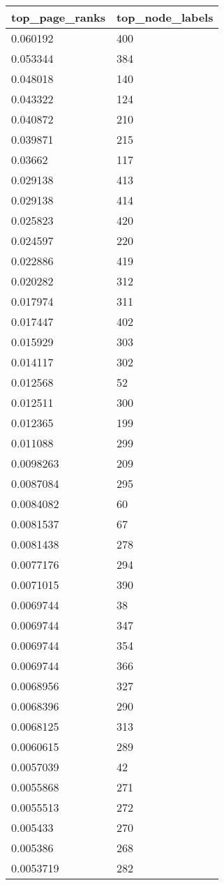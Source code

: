 \begin{tabular}{ll}
top_page_ranks & top_node_labels \\ 
\hline 
0.060192 & 400 \\ 
0.053344 & 384 \\ 
0.048018 & 140 \\ 
0.043322 & 124 \\ 
0.040872 & 210 \\ 
0.039871 & 215 \\ 
0.03662 & 117 \\ 
0.029138 & 413 \\ 
0.029138 & 414 \\ 
0.025823 & 420 \\ 
0.024597 & 220 \\ 
0.022886 & 419 \\ 
0.020282 & 312 \\ 
0.017974 & 311 \\ 
0.017447 & 402 \\ 
0.015929 & 303 \\ 
0.014117 & 302 \\ 
0.012568 & 52 \\ 
0.012511 & 300 \\ 
0.012365 & 199 \\ 
0.011088 & 299 \\ 
0.0098263 & 209 \\ 
0.0087084 & 295 \\ 
0.0084082 & 60 \\ 
0.0081537 & 67 \\ 
0.0081438 & 278 \\ 
0.0077176 & 294 \\ 
0.0071015 & 390 \\ 
0.0069744 & 38 \\ 
0.0069744 & 347 \\ 
0.0069744 & 354 \\ 
0.0069744 & 366 \\ 
0.0068956 & 327 \\ 
0.0068396 & 290 \\ 
0.0068125 & 313 \\ 
0.0060615 & 289 \\ 
0.0057039 & 42 \\ 
0.0055868 & 271 \\ 
0.0055513 & 272 \\ 
0.005433 & 270 \\ 
0.005386 & 268 \\ 
0.0053719 & 282 \\ 

\end{tabular}
